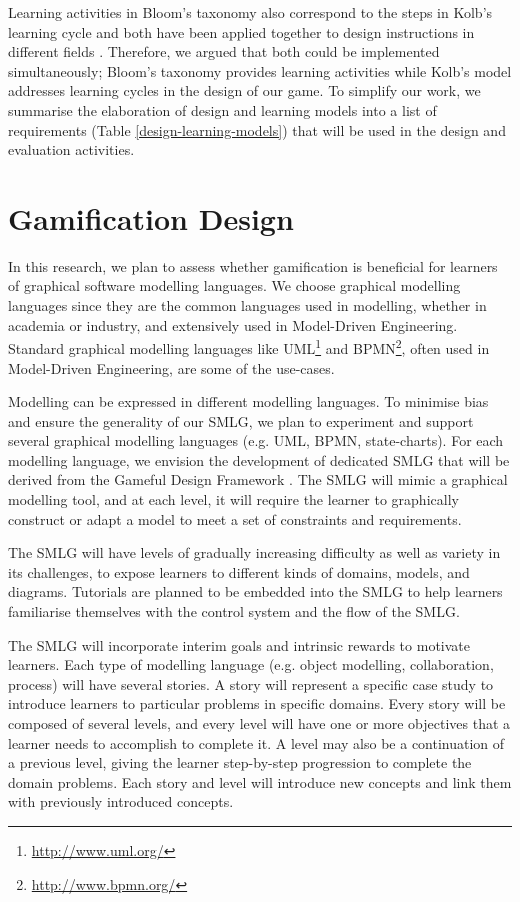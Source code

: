 \documentclass[12pt, a4paper]{report}
\begin{document}
{Learning activities in Bloom's taxonomy also correspond to the steps in Kolb's learning cycle \cite{murphy2007prior} and both have been applied together to design instructions in different fields \cite{terry1993kolb, howard1996felder, schatzberg2002applying}. Therefore, we argued that both could be implemented simultaneously; Bloom's taxonomy provides learning activities while Kolb's model addresses learning cycles in the design of our game. To simplify our work, we summarise the elaboration of design and learning models into a list of requirements (Table \ref{design-learning-models}) that will be used in the design and evaluation activities.

\section{Gamification Design}
\label{Gamification Design}
In this research, we plan to assess whether gamification is beneficial for learners of graphical software modelling languages. We choose graphical modelling languages since they are the common languages used in modelling, whether in academia or industry, and extensively used in Model-Driven Engineering. Standard graphical modelling languages like UML\footnote{\url{http://www.uml.org/}} and BPMN\footnote{\url{http://www.bpmn.org/}}, often used in Model-Driven Engineering, are some of the use-cases.        

Modelling can be expressed in different modelling languages. To minimise bias and ensure the generality of our SMLG, we plan to experiment and support several graphical modelling languages (e.g. UML, BPMN, state-charts). For each modelling language, we envision the development of dedicated SMLG that will be derived from the Gameful Design Framework \cite{deterding2015lens}. The SMLG will mimic a graphical modelling tool, and at each level, it will require the learner to graphically construct or adapt a model to meet a set of constraints and requirements.

The SMLG will have levels of gradually increasing difficulty as well as variety in its challenges, to expose learners to different kinds of domains, models, and diagrams. Tutorials are planned to be embedded into the SMLG to help learners familiarise themselves with the control system and the flow of the SMLG. 

The SMLG will incorporate interim goals and intrinsic rewards to motivate learners. Each type of modelling language (e.g. object modelling, collaboration, process) will have several stories. A story will represent a specific case study to introduce learners to particular problems in specific domains. Every story will be composed of several levels, and every level will have one or more objectives that a learner needs to accomplish to complete it. A level may also be a continuation of a previous level, giving the learner step-by-step progression to complete the domain problems. Each story and level will introduce new concepts and link them with previously introduced concepts.

}
\end{document}
